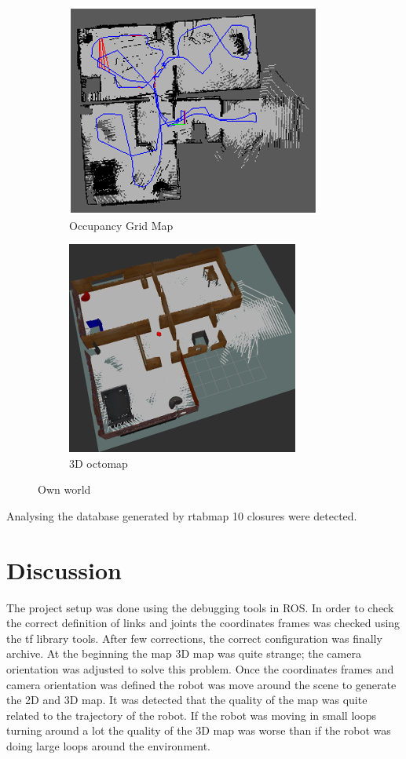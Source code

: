 \documentclass[10pt,journal,compsoc]{IEEEtran}
\begin{document}
\begin{figure}[h]
\centering
\begin{subfigure}[b]{0.2\textwidth}
\includegraphics[scale=0.3]{own-occupancy-grid-map}
\caption{Occupancy Grid Map}
\end{subfigure}
\begin{subfigure}[b]{0.2\textwidth}
\includegraphics[scale=0.3]{own-3d-map}
\caption{3D octomap}
\end{subfigure}
\caption{Own world}
\end{figure}

Analysing the database generated by rtabmap 10 closures were detected.

\section{Discussion}
The project setup was done using the debugging tools in ROS. In order to check the correct definition of links and joints the coordinates frames was checked using the tf library tools. After few corrections, the correct configuration was finally archive. At the beginning the map 3D map was quite strange; the camera orientation was adjusted to solve this problem. Once the coordinates frames and camera orientation was defined the robot was move around the scene to generate the 2D and 3D map. It was detected that the quality of the map was quite related to the trajectory of the robot. If the robot was moving in small loops turning around a lot the quality of the 3D map was worse than if the robot was doing large loops around the environment.
\end{document}
